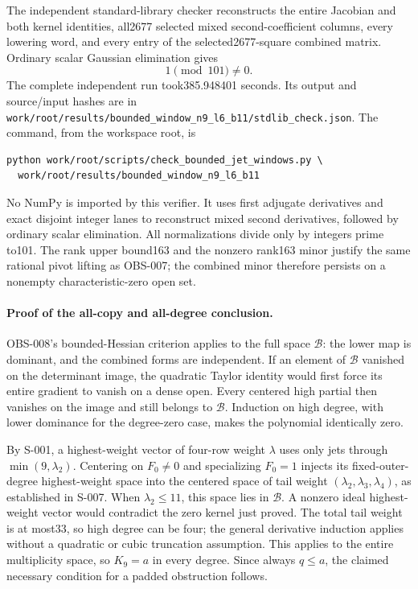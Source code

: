 The independent standard-library checker reconstructs the entire
Jacobian and both kernel identities, all2677 selected mixed
second-coefficient columns, every lowering word, and every entry of
the selected2677-square combined matrix. Ordinary scalar Gaussian
elimination gives
\[
                         1\pmod{101}\ne0.
\]
The complete independent run took385.948401 seconds. Its output and
source/input hashes are in
\texttt{work/root/results/bounded\_window\_n9\_l6\_b11/stdlib\_check.json}.
The command, from the workspace root, is
\begin{verbatim}
python work/root/scripts/check_bounded_jet_windows.py \
  work/root/results/bounded_window_n9_l6_b11
\end{verbatim}
No NumPy is imported by this verifier. It uses first adjugate
derivatives and exact disjoint integer lanes to reconstruct mixed
second derivatives, followed by ordinary scalar elimination. All
normalizations divide only by integers prime to101. The rank upper
bound163 and the nonzero rank163 minor justify the same rational
pivot lifting as OBS-007; the combined minor therefore persists on
a nonempty characteristic-zero open set.

\paragraph{Proof of the all-copy and all-degree conclusion.}
OBS-008's bounded-Hessian criterion applies to the full space
$\mathcal B$: the lower map is dominant, and the combined forms are
independent. If an element of $\mathcal B$ vanished on the determinant
image, the quadratic Taylor identity would first force its entire
gradient to vanish on a dense open. Every centered high partial then
vanishes on the image and still belongs to $\mathcal B$. Induction
on high degree, with lower dominance for the degree-zero case, makes
the polynomial identically zero.

By S-001, a highest-weight vector of four-row weight $\lambda$ uses
only jets through $\min(9,\lambda_2)$. Centering on $F_0\ne0$ and
specializing $F_0=1$ injects its fixed-outer-degree highest-weight
space into the centered space of tail weight
$(\lambda_2,\lambda_3,\lambda_4)$, as established in S-007.
When $\lambda_2\leq11$, this space lies in $\mathcal B$.
A nonzero ideal highest-weight vector would contradict the zero
kernel just proved. The total tail weight is at most33, so high
degree can be four; the general derivative induction applies without
a quadratic or cubic truncation assumption. This applies to the entire multiplicity space,
so $K_9=a$ in every degree. Since always $q\leq a$, the claimed
necessary condition for a padded obstruction follows.

